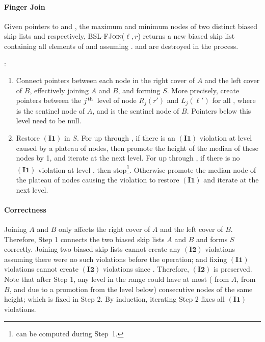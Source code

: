 \documentclass[11pt]{article}
\newcommand{\ens}[1]{\ensuremath{#1}}
\newcommand{\jth}{\ens{j^{\mbox{\hspace{.2mm}\scriptsize th}}}}
\newcommand{\Bslfjoinx}[2]{\mbox{\textsc{BSL-FJoin(\ensuremath{#1,#2})}}}
\newcommand{\invone}{\ensuremath{\mathbf{(I1)}}}
\newcommand{\invtwo}{\ensuremath{\mathbf{(I2)}}}
\newcommand{\bsl}[1]{\ensuremath{#1}}
\newcommand{\lvlpre}[2]{\ensuremath{L_{#1}(#2)}}
\newcommand{\lvlsuc}[2]{\ensuremath{R_{#1}(#2)}}
\begin{document}
\paragraph{Finger Join} 
Given pointers to  and , the maximum and minimum nodes of two distinct biased skip lists  and  respectively, \Bslfjoinx{\ell}{r} returns a new biased skip list  containing all elements of  and  assuming .  and  are destroyed in the process. 


\vspace{5mm} 
\noindent :
\begin{enumerate} 
\item Connect pointers between each node in the right cover of \bsl A and the left cover of \bsl B, effectively joining \bsl A and \bsl B, and forming \bsl S. 
More precisely, create pointers between the \jth\ level of node \lvlsuc{j}{r'} and \lvlpre{j}{\ell'} for all , where  is the  sentinel node of \bsl A, and  is the  sentinel node of \bsl B. Pointers below this level need to be null. 

\item Restore \invone{} in \bsl S. For  up through , if there is an \invone{} violation at level  caused by a plateau of  nodes, then promote the height of the median of these nodes by 1, and iterate at the next level. For  up through , if there is no \invone{} violation at level , then stop\footnote{ can be computed during Step~1.}. Otherwise promote the median node of the plateau of  nodes causing the violation to restore \invone{} and iterate at the next level. 
\end{enumerate} 

\paragraph{Correctness} 
Joining \bsl A and \bsl B only affects the right cover of \bsl A and the left cover of \bsl B. Therefore, Step 1 connects the two biased skip lists \bsl A and \bsl B and forms \bsl S correctly. Joining two biased skip lists cannot create any \invtwo{} violations assuming there were no such violations before the operation; and fixing \invone{} violations cannot create \invtwo{} violations since . Therefore, \invtwo{} is preserved. Note that after Step 1, any level in the range  could have at most  ( from \bsl A,  from \bsl B, and  due to a promotion from the level below) consecutive nodes of the same height; which is fixed in Step 2. By induction, iterating Step 2 fixes all \invone{} violations. 
\end{document}
